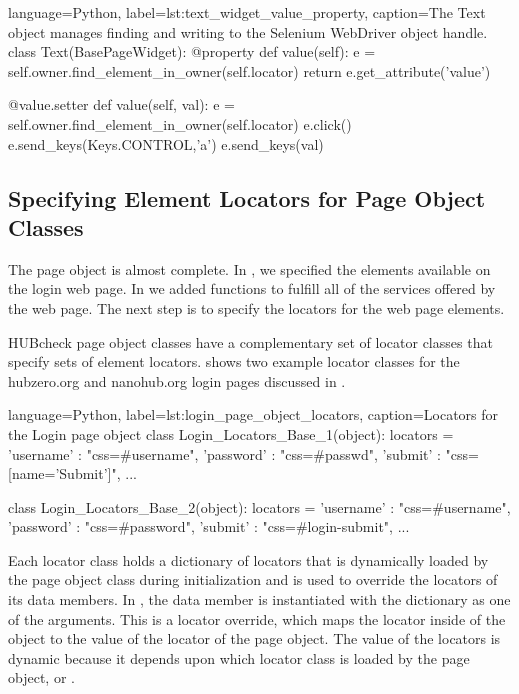 \begin{xcode}{%
  language=Python,%
  label=lst:text_widget_value_property,%
  caption={The Text object manages finding and writing to the Selenium  %
            WebDriver object handle.}%
}
class Text(BasePageWidget):
    @property
    def value(self):
        e = self.owner.find_element_in_owner(self.locator)
        return e.get_attribute('value')

    @value.setter
    def value(self, val):
        e = self.owner.find_element_in_owner(self.locator)
        e.click()
        e.send_keys(Keys.CONTROL,'a')
        e.send_keys(val)
\end{xcode}

\subsection{Specifying Element Locators for Page Object Classes}
\label{ssec:specifying_page_object_element_locators}

The  page object is almost complete. In
, we specified the elements available on the
login web page. In  we added
functions to fulfill all of the services offered by the web page. The next step
is to specify the locators for the web page elements.

HUBcheck page object classes have a complementary set of
locator classes that specify sets of element
locators.  shows two example
locator classes for the hubzero.org and nanohub.org login pages discussed in
.

\begin{xcode}{%
  language=Python,%
  label=lst:login_page_object_locators,%
  caption={Locators for the Login page object}%
}
class Login_Locators_Base_1(object):
    locators = {
        'username'  : "css=#username",
        'password'  : "css=#passwd",
        'submit'    : "css=[name='Submit']",
        ...
    }

class Login_Locators_Base_2(object):
    locators = {
        'username'  : "css=#username",
        'password'  : "css=#password",
        'submit'    : "css=#login-submit",
        ...
    }
\end{xcode}

Each locator class holds a dictionary of locators that is dynamically loaded by
the page object class during initialization and is used to override the
locators of its data members.  In ,
the  data member is instantiated with the dictionary
 as one of the arguments. This is a locator
override, which maps the  locator inside of the
 object to the value of the  locator of
the  page object. The value of the  locators is
dynamic because it depends upon which locator class is loaded by the page
object,  or .

